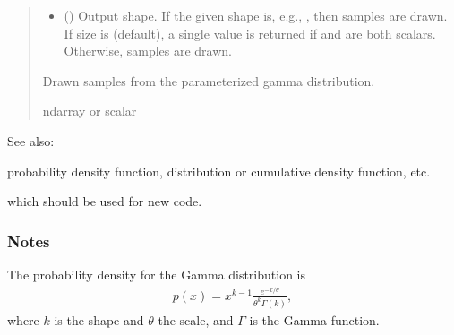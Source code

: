\documentclass[letterpaper,10pt,english]{sphinxmanual}
\begin{document}
\begin{fulllineitems}
\begin{quote}
\begin{description}
\begin{itemize}
\item {} 
\sphinxAtStartPar
{} (\sphinxstyleliteralemphasis{\sphinxupquote{, }}) \textendash{} Output shape.  If the given shape is, e.g., , then
 samples are drawn.  If size is  (default),
a single value is returned if  and  are both scalars.
Otherwise,  samples are drawn.

\end{itemize}

\sphinxAtStartPar
{} \textendash{} Drawn samples from the parameterized gamma distribution.

\sphinxAtStartPar
ndarray or scalar

\end{description}\end{quote}


\begin{sphinxseealso}{See also:}
\begin{description}
\sphinxAtStartPar
probability density function, distribution or cumulative density function, etc.

\sphinxAtStartPar
which should be used for new code.

\end{description}


\end{sphinxseealso}

\subsubsection*{Notes}

\sphinxAtStartPar
The probability density for the Gamma distribution is
\begin{equation*}
\begin{split}p(x) = x^{k-1}\frac{e^{-x/\theta}}{\theta^k\Gamma(k)},\end{split}
\end{equation*}
\sphinxAtStartPar
where \(k\) is the shape and \(\theta\) the scale,
and \(\Gamma\) is the Gamma function.


\end{fulllineitems}
\end{document}
